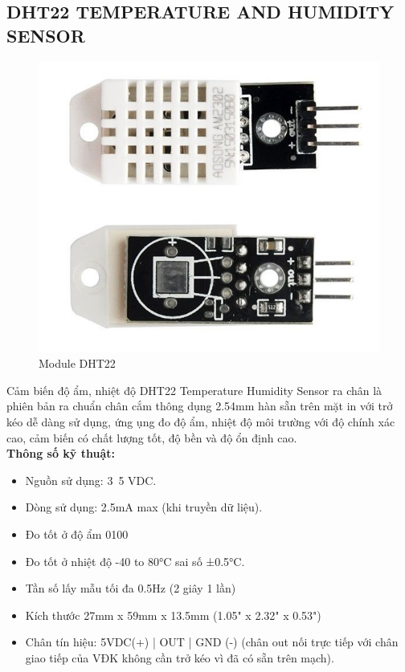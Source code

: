 \subsection{DHT22 TEMPERATURE AND HUMIDITY SENSOR}
\begin{figure}[H]
	\centering
	\includegraphics[scale=.5]{Chapter 3/image chapter 3/DHT22.jpg}
	\caption[Module DHT22]{Module DHT22}
	\label{hinh38}
\end{figure}
Cảm biến độ ẩm, nhiệt độ DHT22 Temperature Humidity Sensor ra chân là phiên bản ra chuẩn chân cắm thông dụng 2.54mm hàn sẵn trên mặt in với trở kéo dễ dàng sử dụng, ứng ụng đo độ ẩm, nhiệt độ môi trường với độ chính xác cao, cảm biến có chất lượng tốt, độ bền và độ ổn định cao.\\
\indent \textbf{Thông số kỹ thuật:}
\begin{itemize}
	\item Nguồn sử dụng: 3~5 VDC.
	\item Dòng sử dụng: 2.5mA max (khi truyền dữ liệu).
	\item Đo tốt ở độ ẩm 0100%
	\item Đo tốt ở nhiệt độ -40 to 80°C sai số ±0.5°C.
	\item Tần số lấy mẫu tối đa 0.5Hz (2 giây 1 lần)
	\item Kích thước 27mm x 59mm x 13.5mm (1.05" x 2.32" x 0.53")
	\item Chân tín hiệu: 5VDC(+) | OUT | GND (-) (chân out nối trực tiếp với chân giao tiếp của VĐK không cần trở kéo vì đã có sẵn trên mạch).
\end{itemize}
